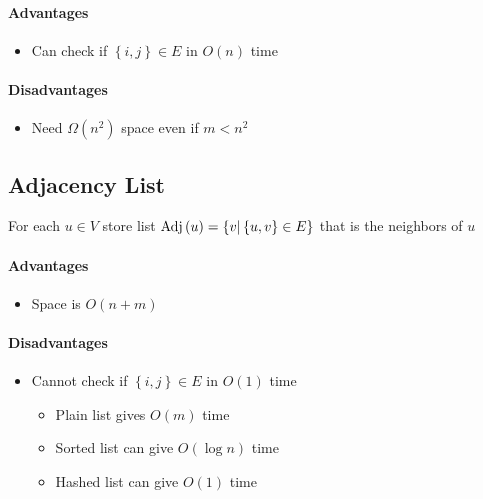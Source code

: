     \paragraph{Advantages}
    \begin{itemize}
      \item Can check if $ \left\{ i, j \right\} \in E $ in
      $ O\left( n \right) $ time
    \end{itemize}

    \paragraph{Disadvantages}
    \begin{itemize}
      \item Need $ \Omega\left( n^{2} \right) $ space even if $ m < n^{2} $
    \end{itemize}

  \subsection{Adjacency List}

    For each $ u \in V $ store list
    $ \operatorname{Adj}\left( u \right) = \left\{ v | \left\{ u, v \right\} \in E \right\} $
    that is the neighbors of $ u $

    \paragraph{Advantages}
    \begin{itemize}
      \item Space is $ O\left( n + m \right) $
    \end{itemize}

    \paragraph{Disadvantages}
    \begin{itemize}
      \item Cannot check if $ \left\{ i, j \right\} \in E $ in
      $ O\left( 1 \right) $ time
      \begin{itemize}
        \item Plain list gives $ O\left( m \right) $ time
        \item Sorted list can give $ O\left( \log n \right) $ time
        \item Hashed list can give $ O\left( 1 \right) $ time
      \end{itemize}
    \end{itemize}


